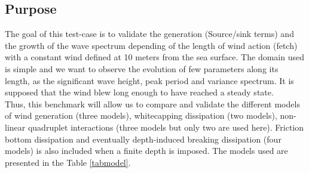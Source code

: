 \subsection{Purpose}
The goal of this test-case is to validate the generation (Source/sink terms)  and the growth of the wave spectrum depending of the length of wind action (fetch) with a constant wind defined at 10 meters from the sea surface. The domain used is simple and we want to observe the evolution of few parameters along its length, as the significant wave height, peak period and variance spectrum.
It is supposed that the wind blew long enough to have reached a steady state.\\
Thus, this benchmark will allow us to compare and validate the different models of wind generation (three models), whitecapping dissipation (two models), non-linear quadruplet interactions (three models but only two are used here). Friction bottom dissipation and eventually depth-induced breaking dissipation (four models) is also included when a finite depth is imposed. The models used are presented in the Table \ref{tabmodel}.
